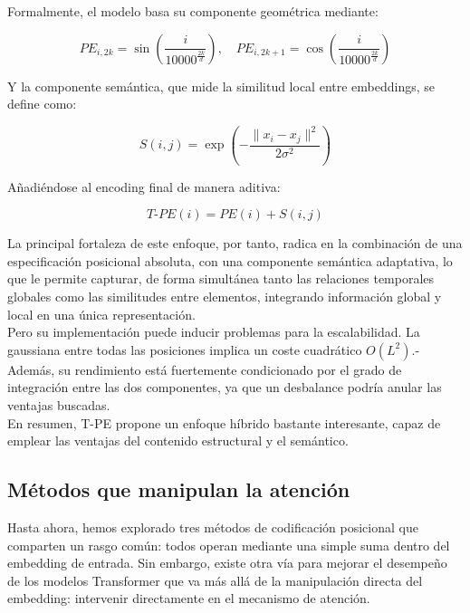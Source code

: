 Formalmente, el modelo basa su componente geométrica mediante:

\begin{equation}
	PE_{i, 2k} = \sin\left(\frac{i}{10000^{\frac{2k}{d}}}\right), \quad
	PE_{i, 2k+1} = \cos\left(\frac{i}{10000^{\frac{2k}{d}}}\right)
\end{equation}

Y la componente semántica, que mide la similitud local entre embeddings, se define como:

$$S(i, j) = \exp\left( -\frac{\|x_i - x_j\|^2}{2\sigma^2} \right)$$

Añadiéndose al encoding final de manera aditiva:

$$T\text{-}PE(i) = PE(i) + S(i, j)$$


La principal fortaleza de este enfoque, por tanto, radica en la combinación de una especificación posicional absoluta, con una componente semántica adaptativa, lo que le permite capturar, de forma simultánea tanto las relaciones temporales globales como las similitudes entre elementos, integrando información global y local en una única representación.\\

Pero su implementación puede inducir problemas para la escalabilidad. La gaussiana entre todas las posiciones implica un coste cuadrático $O(L^2)$.- Además, su rendimiento está fuertemente condicionado por el grado de integración entre las dos componentes, ya que un desbalance podría anular las ventajas buscadas.\\

En resumen, T-PE propone un enfoque híbrido bastante interesante, capaz de emplear las ventajas del contenido estructural y el semántico.


\subsection{Métodos que manipulan la atención}

Hasta ahora, hemos explorado tres métodos de codificación posicional que comparten un rasgo común: todos operan mediante una simple suma dentro del embedding de entrada. Sin embargo, existe otra vía para mejorar el desempeño de los modelos Transformer que va más allá de la manipulación directa del embedding: intervenir directamente en el mecanismo de atención.\\

